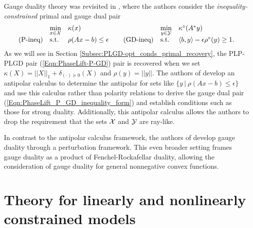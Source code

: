 Gauge duality theory was revisited in \cite{DBLP:journals/siamjo/FriedlanderMP14}, where the authors consider the \textit{inequality-constrained} primal and gauge dual pair
\begin{equation} 			\label{Eqn:PhaseLift_P_GD_inequality_form}
\begin{array}{lllllll}
	&	\min\limits_{\substack{x \in {\mathcal X}}}
		&	\kappa(x)
			&
				&	\min\limits_{\substack{y \in {\mathcal Y}}}
					&	\kappa^\circ(A^*y)
						\\
\textnormal{(P-ineq)}
	&	\textnormal{s.t.}
		& 	\rho(Ax-b) \leq \epsilon
			&	\hspace{0.4cm} 	\textnormal{(GD-ineq)}
				&	\textnormal{s.t.}
					&	\langle b, y \rangle - \epsilon \rho^\circ(y) \geq 1.
\end{array}
\end{equation}
As we will see in Section \ref{Subsec:PLGD-opt_conds_primal_recovery}, the PLP-PLGD pair (\ref{Eqn:PhaseLift-P-GD}) pair is recovered when we set $\kappa(X) = ||X||_1 + \delta_{(\cdot) \succeq 0}(X)$ and $\rho(y) = ||y||$.  The authors of \cite{DBLP:journals/siamjo/FriedlanderMP14} develop an antipolar calculus to determine the antipolar for sets like $\{ y \ | \ \rho(Ax-b) \leq \epsilon \}$ and use this calculus rather than polarity relations to derive the gauge dual pair (\ref{Eqn:PhaseLift_P_GD_inequality_form}) and establish conditions such as those for strong duality.  Additionally, this antipolar calculus allows the authors to drop the requirement that the sets ${\mathcal X}$ and ${\mathcal Y}$ are ray-like.

In contrast to the antipolar calculus framework, the authors of \cite{aravkin2017foundations} develop gauge duality through a perturbation framework.  This even broader setting frames gauge duality as a product of Fenchel-Rockafellar duality, allowing the consideration of gauge duality for 
general nonnegative convex functions.









\section{Theory for linearly and nonlinearly constrained models} 			\label{Subsec:PLGD-theory}






